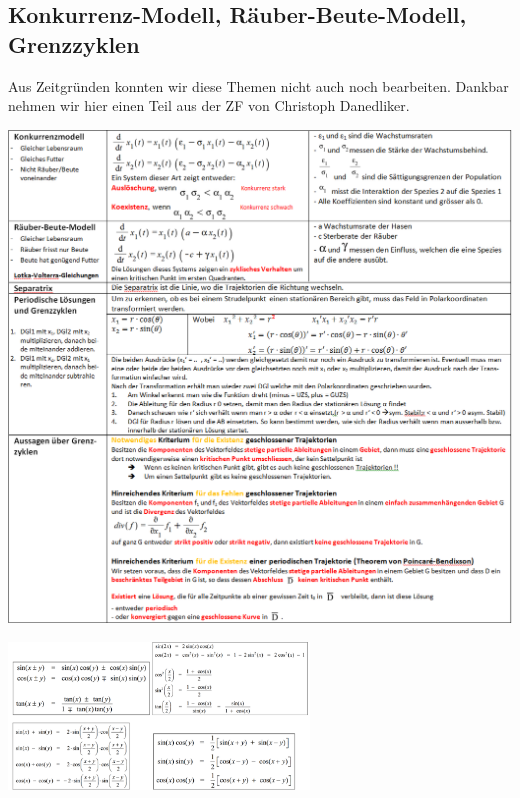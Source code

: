 \subsection{Konkurrenz-Modell, Räuber-Beute-Modell, Grenzzyklen}
Aus Zeitgründen konnten wir diese Themen nicht auch noch bearbeiten. Dankbar nehmen wir hier einen Teil aus der ZF von Christoph Danedliker. \\
\begin{minipage}[h]{1\textwidth}
	\includegraphics[width=1.0\textwidth]{images/Rest.png}
\end{minipage}
\begin{minipage}[h]{1\textwidth}
	\includegraphics[width=0.6\textwidth]{images/Sinus.png}
\end{minipage}